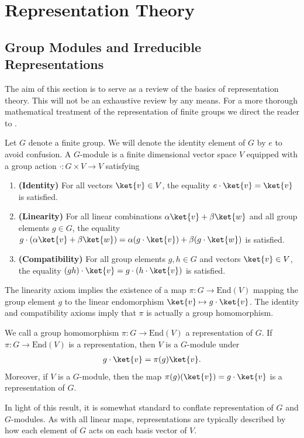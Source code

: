 \section{Representation Theory}\label{sec:rep-theory}

\subsection{Group Modules and Irreducible Representations}

The aim of this section is to serve as a review of the basics of representation theory.
This will not be an exhaustive review by any means.
For a more thorough mathematical treatment of the representation of finite groups we direct the reader to \cite{sagan2001symmetric}.

Let $G$ denote a finite group. We will denote the identity element of $G$ by $e$ to avoid confusion. 
A $G$-module is a finite dimensional vector space $V$ equipped with a group action $\cdot : G \times V \to V$ satisfying 
\begin{enumerate}
    \item \textbf{(Identity)} For all vectors $\ket{v} \in V$, the equality $e \cdot \ket{v} = \ket{v}$ is satisfied.
    \item \textbf{(Linearity)} For all linear combinations $\alpha \ket{v} + \beta \ket{w}$ and all group elements $g \in G$, the equality $g \cdot (\alpha \ket{v}+\beta\ket{w}) = \alpha (g\cdot \ket{v}) + \beta (g \cdot \ket{w})$ is satisfied.
    \item \textbf{(Compatibility)} For all group elements $g,h \in G$ and vectors $\ket{v} \in V$, the equality $(gh) \cdot \ket{v} = g\cdot (h \cdot \ket{v})$ is satisfied.
\end{enumerate}
The linearity axiom implies the existence of a map $\pi: G \to \mathrm{End}(V)$ mapping the group element $g$ to the linear endomorphism $\ket{v} \mapsto g\cdot \ket{v}$. 
The identity and compatibility axioms imply that $\pi$ is actually a group homomorphism. 

\begin{lemma}
    We call a group homomorphism $\pi : G \to \mathrm{End}(V)$ a representation of $G$. If $\pi: G \to \mathrm{End}(V)$ is a representation, then $V$ is a $G$-module under 
    \begin{align}
        g \cdot \ket{v} = \pi(g)\ket{v}.
    \end{align}
    Moreover, if $V$ is a $G$-module, then the map $\pi(g)(\ket{v}) = g\cdot \ket{v}$ is a representation of $G$.
\end{lemma}
In light of this result, it is somewhat standard to conflate representation of $G$ and $G$-modules. 
As with all linear maps, representations are typically described by how each element of $G$ acts on each basis vector of $V$.


